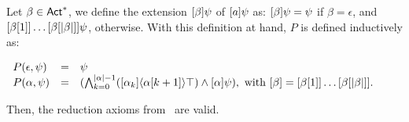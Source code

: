 \begin{proposition}\label{pro:srefaxioms}
Let $\beta \in {\rm \sf Act}^*$, we define the extension $[\beta]\psi$ of $[a]\psi$ as: $[\beta]\psi = \psi$ if $\beta=\epsilon$, and $[\beta[1]] \dots [\beta[|{\beta}|]] \psi$, otherwise.
With this definition at hand, $P$ is defined inductively as: 
\begin{spcenter}
$\begin{array}{lcl}
        P(\epsilon,\psi) & = & \psi \\
        P(\alpha,\psi)  &= &(\bigwedge_{k=0}^{|{\alpha}|-1}([\alpha_k]\langle \alpha[k+1] \rangle\top) \wedge [\alpha] \psi), \mbox{ with } [\beta] = [\beta[1]] \dots [\beta[|{\beta}|]]. 
    \end{array}$
\end{spcenter}
Then, the reduction axioms from~ are valid.
\end{proposition}
